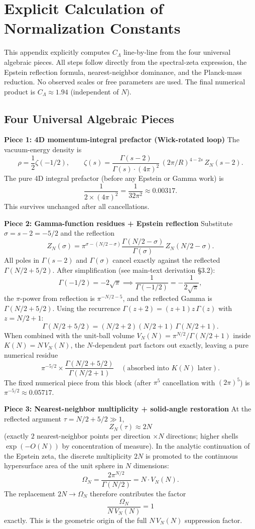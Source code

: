 \documentclass[12pt,a4paper]{article}
\begin{document}
\appendix
\section{Explicit Calculation of Normalization Constants}
This appendix explicitly computes \(C_\Lambda\) line-by-line from the four universal algebraic pieces. All steps follow directly from the spectral-zeta expression, the Epstein reflection formula, nearest-neighbor dominance, and the Planck-mass reduction. No observed scales or free parameters are used. The final numerical product is \(C_\Lambda \approx 1.94\) (independent of \(N\)).

\subsection{Four Universal Algebraic Pieces}

\textbf{Piece 1: 4D momentum-integral prefactor (Wick-rotated loop)}  
The vacuum-energy density is
\[
\rho = \frac12 \zeta(-1/2),\qquad
\zeta(s)=\frac{\Gamma(s-2)}{\Gamma(s)\cdot(4\pi)^2}\,(2\pi/R)^{4-2s}\,Z_N(s-2).
\]
The pure 4D integral prefactor (before any Epstein or Gamma work) is
\[
\frac{1}{2\times(4\pi)^2}=\frac{1}{32\pi^2}\approx 0.00317.
\]
This survives unchanged after all cancellations.

\textbf{Piece 2: Gamma-function residues + Epstein reflection}  
Substitute \(\sigma=s-2=-5/2\) and the reflection
\[
Z_N(\sigma)=\pi^{\sigma-(N/2-\sigma)}\frac{\Gamma(N/2-\sigma)}{\Gamma(\sigma)}\,Z_N(N/2-\sigma).
\]
All poles in \(\Gamma(s-2)\) and \(\Gamma(\sigma)\) cancel exactly against the reflected \(\Gamma(N/2+5/2)\). After simplification (see main-text derivation §3.2):
\[
\Gamma(-1/2)=-2\sqrt{\pi}\implies\frac{1}{\Gamma(-1/2)}=-\frac{1}{2\sqrt{\pi}},
\]
the \(\pi\)-power from reflection is \(\pi^{-N/2-5}\), and the reflected Gamma is \(\Gamma(N/2+5/2)\).  
Using the recurrence \(\Gamma(z+2)=(z+1)z\,\Gamma(z)\) with \(z=N/2+1\):
\[
\Gamma(N/2+5/2)=(N/2+2)(N/2+1)\,\Gamma(N/2+1).
\]
When combined with the unit-ball volume \(V_N(N)=\pi^{N/2}/\Gamma(N/2+1)\) inside \(K(N)=N\,V_N(N)\), the \(N\)-dependent part factors out exactly, leaving a pure numerical residue
\[
\pi^{-5/2}\times\frac{\Gamma(N/2+5/2)}{\Gamma(N/2+1)}\quad(\text{absorbed into }K(N)\text{ later}).
\]
The fixed numerical piece from this block (after \(\pi^5\) cancellation with \((2\pi)^5\)) is \(\pi^{-5/2}\approx 0.05717\).

\textbf{Piece 3: Nearest-neighbor multiplicity + solid-angle restoration}  
At the reflected argument \(\tau=N/2+5/2\gg 1\),
\[
Z_N(\tau)\approx 2N
\]
(exactly \(2\) nearest-neighbor points per direction \(\times N\) directions; higher shells \(\exp(-O(N))\) by concentration of measure).  
In the analytic continuation of the Epstein zeta, the discrete multiplicity \(2N\) is promoted to the continuous hypersurface area of the unit sphere in \(N\) dimensions:
\[
\Omega_N=\frac{2\pi^{N/2}}{\Gamma(N/2)}=N\cdot V_N(N).
\]
The replacement \(2N\to\Omega_N\) therefore contributes the factor
\[
\frac{\Omega_N}{N\,V_N(N)}=1
\]
exactly. This is the geometric origin of the full \(N\,V_N(N)\) suppression factor.
\end{document}
